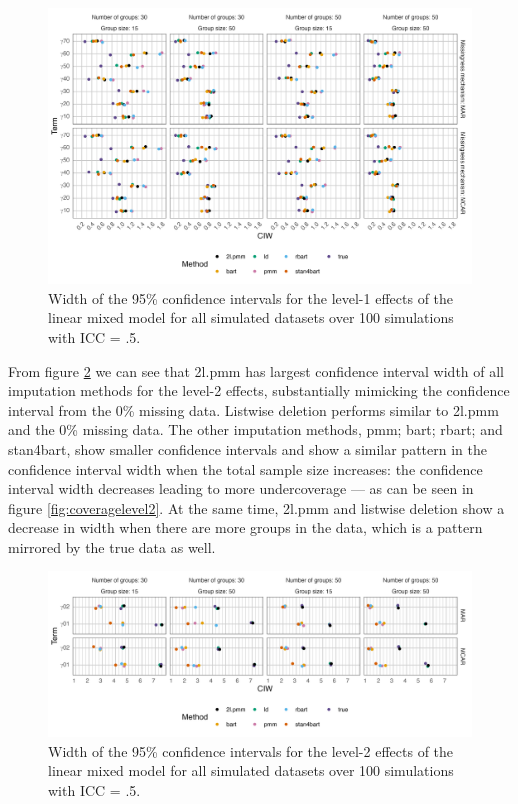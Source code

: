 \documentclass[10pt, a4paper, titlepage]{article}
\begin{document}
\begin{figure}[H]
    \centering
    \includegraphics[width=1\textwidth]{ciwlevel1.png}
    \caption{Width of the 95\% confidence intervals for the level-1 effects of the linear mixed model for all simulated datasets over 100 simulations with ICC = .5.}
    \label{fig:ciwlevel1}
\end{figure}

From figure \ref{fig:ciwlevel2} we can see that 2l.pmm has largest confidence interval width of all imputation methods for the level-2 effects, substantially mimicking the confidence interval from the 0\% missing data. Listwise deletion performs similar to 2l.pmm and the 0\% missing data. The other imputation methods, pmm; bart; rbart; and stan4bart, show smaller confidence intervals and show a similar pattern in the confidence interval width when the total sample size increases: the confidence interval width decreases leading to more undercoverage --- as can be seen in figure \ref{fig:coveragelevel2}. At the same time, 2l.pmm and listwise deletion show a decrease in width when there are more groups in the data, which is a pattern mirrored by the true data as well. 

\begin{figure}[H]
    \centering
    \includegraphics[width=1\textwidth]{ciwlevel2.png}
    \caption{Width of the 95\% confidence intervals for the level-2 effects of the linear mixed model for all simulated datasets over 100 simulations with ICC = .5.}
    \label{fig:ciwlevel2}
\end{figure}
\end{document}
